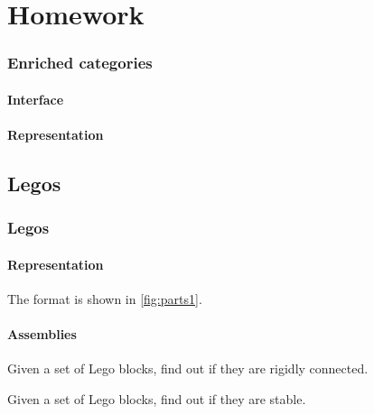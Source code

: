 \part{Homework}













\section{Enriched categories}

\subsection*{Interface}


\subsection*{Representation}


\chapter{Legos}
\label{ch:exercises-legos}


\section{Legos}

\subsection*{Representation}


The format is shown in \cref{fig:parts1}.


\subsection{Assemblies}

\begin{gradedexercise}
  Given a set of Lego blocks, find out if they are rigidly connected.
\end{gradedexercise}

\begin{gradedexercise}
  Given a set of Lego blocks, find out if they are stable.
\end{gradedexercise}


